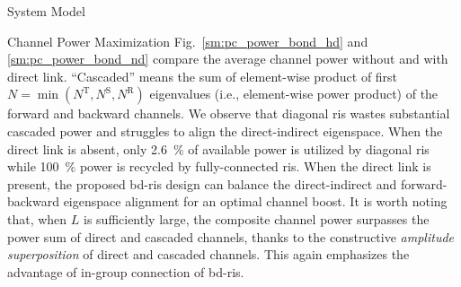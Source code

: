 \documentclass[journal]{IEEEtran}
\begin{document}
\begin{section}{System Model}
\begin{subsection}{Channel Power Maximization}
		Fig.~\ref{sm:pc_power_bond_hd} and \ref{sm:pc_power_bond_nd} compare the average channel power without and with direct link.
		``Cascaded'' means the sum of element-wise product of first $N = \min(N^\mathrm{T}, N^\mathrm{S}, N^\mathrm{R})$ eigenvalues (i.e., element-wise power product) of the forward and backward channels.
		We observe that diagonal \gls{ris} wastes substantial cascaded power and struggles to align the direct-indirect eigenspace.
		When the direct link is absent, only \qty{2.6}{\percent} of available power is utilized by diagonal \gls{ris} while \qty{100}{\percent} power is recycled by fully-connected \gls{ris}.
		When the direct link is present, the proposed \gls{bd}-\gls{ris} design can balance the direct-indirect and forward-backward eigenspace alignment for an optimal channel boost.
		It is worth noting that, when $L$ is sufficiently large, the composite channel power surpasses the power sum of direct and cascaded channels, thanks to the constructive \emph{amplitude superposition} of direct and cascaded channels.
		This again emphasizes the advantage of in-group connection of \gls{bd}-\gls{ris}.



\end{subsection}
\end{section}
\end{document}
